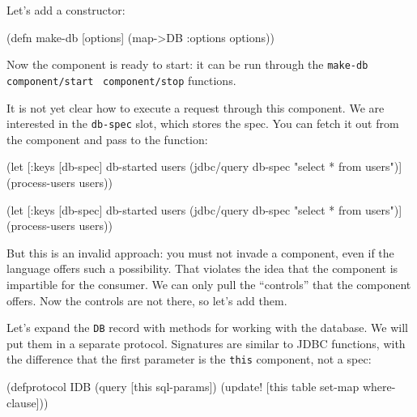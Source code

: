 \fi

\noindent
Let's add a constructor:

\begin{english}
  \begin{clojure}
(defn make-db [options]
  (map->DB {:options options}))
  \end{clojure}
\end{english}

Now the component is ready to start: it can be run through the \verb|make-db|~\arr{} \texttt{component\-/start}~\arr{} \verb|component/stop| functions.

It is not yet clear how to execute a request through this component. We are interested in the \verb|db-spec| slot, which stores the spec. You can fetch it out from the component and pass to the function:

\ifnarrow

\begin{english}
  \begin{clojure}
(let [{:keys [db-spec]} db-started
      users (jdbc/query db-spec
              "select * from users")]
  (process-users users))
  \end{clojure}
\end{english}

\else

\begin{english}
  \begin{clojure}
(let [{:keys [db-spec]} db-started
      users (jdbc/query db-spec "select * from users")]
  (process-users users))
  \end{clojure}
\end{english}

\fi

But this is an invalid approach: you must not invade a component, even if the language offers such a possibility. That violates the idea that the component is impartible for the consumer. We can only pull the ``controls'' that the component offers. Now the controls are not there, so let's add them.

Let's expand the \verb|DB| record with methods for working with the database. We will put them in a separate protocol. Signatures are similar to JDBC functions, with the difference that the first parameter is the \verb|this| component, not a spec:


\ifnarrow

\begin{english}
  \begin{clojure}
(defprotocol IDB
  (query [this sql-params])
  (update!
    [this table set-map where-clause]))
  \end{clojure}
\end{english}

